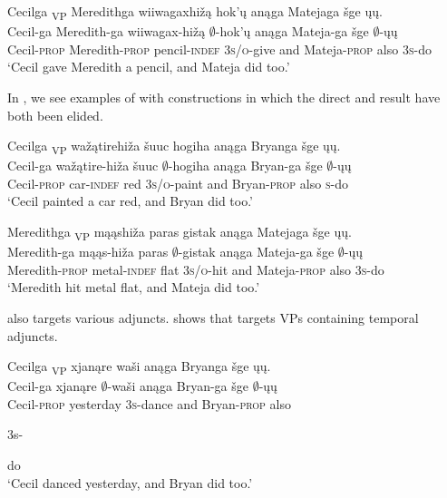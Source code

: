 \documentclass[output=paper]{LSP/langsci}
\begin{document}
 
\ea\label{ex:johnson:5} 
\glll Cecilga {\ob}\textsubscript{VP} Meredithga wiiwagaxhižą hok'ų{\cb} anąga Matejaga šge {\ob}ųų{\cb}.\\
Cecil-ga {} Meredith-ga wiiwagax-hižą $\emptyset$-hok'ų anąga Mateja-ga šge $\emptyset$-ųų\\
Cecil-\textsc{prop} {} Meredith-\textsc{prop} pencil-\textsc{indef} \textsc{3s/o}-give and Mateja-\textsc{prop} also \textsc{3s}-do\\
\trans `Cecil gave Meredith a pencil, and Mateja did too.'
\z

In , we see examples of  with  constructions in which the direct  and result have both been elided. 
 
\ea\label{ex:johnson:6}
\ea\label{ex:johnson:6a} 
\glll Cecilga  {\ob}\textsubscript{VP} wažątirehiža šuuc hogiha{\cb} anąga Bryanga šge {\ob}ųų{\cb}.\\
Cecil-ga {} wažątire-hiža šuuc $\emptyset$-hogiha anąga Bryan-ga šge $\emptyset$-ųų\\
Cecil-\textsc{prop} {} car-\textsc{indef} red \textsc{3s/o}-paint and Bryan-\textsc{prop} also \textsc {s}-do\\
\trans `Cecil painted a car red, and Bryan did too.'
 
\ex\label{ex:johnson:6b} 
\glll Meredithga  {\ob}\textsubscript{VP} mąąshiža paras gistak{\cb} anąga Matejaga šge {\ob}ųų{\cb}.\\
Meredith-ga {} mąąs-hiža paras $\emptyset$-gistak anąga Mateja-ga šge $\emptyset$-ųų\\
Meredith-\textsc{prop} {} metal-\textsc{indef} flat \textsc{3s/o}-hit and Mateja-\textsc{prop} also \textsc{3s}-do\\
\trans `Meredith hit metal flat, and Mateja did too.'
\z
\z

 also targets various adjuncts.  shows that  targets VPs containing temporal adjuncts. 
 
\ea\label{ex:johnson:7}
\ea 
\glll Cecilga {\ob}\textsubscript{VP} xjanąre waši{\cb} anąga Bryanga šge {\ob}ųų{\cb}.\\
Cecil-ga {} xjanąre $\emptyset$-waši anąga Bryan-ga šge $\emptyset$-ųų\\
Cecil-\textsc{prop} {} yesterday \textsc{3s}-dance and Bryan-\textsc{prop} also \begin{sc}3s-\end{sc}do\\
\trans `Cecil danced yesterday, and Bryan did too.'
\end{document}
